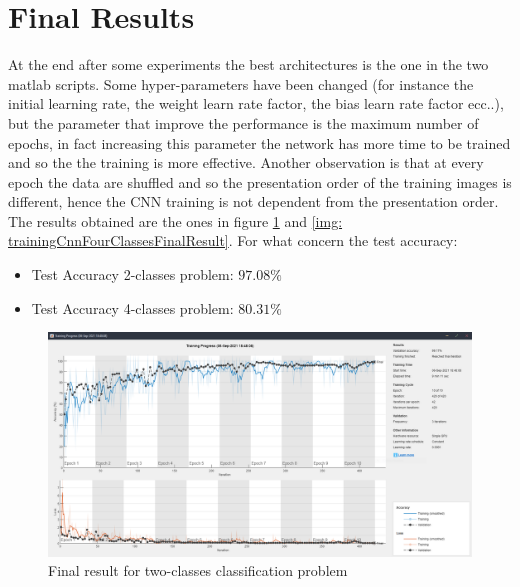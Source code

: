 \documentclass[a4paper]{report}
\begin{document}
	\section{Final Results}
	\label{sec: final}
	\noindent At the end after some experiments the best architectures is the one in the two matlab scripts. Some hyper-parameters have been changed (for instance the initial learning rate, the weight learn rate factor, the bias learn rate factor ecc..), but the parameter that improve the performance is the maximum number of epochs, in fact increasing this parameter the network has more time to be trained and so the the training is more effective. Another observation is that at every epoch the data are shuffled and so the presentation order of the training images is different, hence the CNN training is not dependent from the presentation order. The results obtained are the ones in figure \ref{img: trainingCnnTwoClassesFinalResult} and \ref{img: trainingCnnFourClassesFinalResult}. For what concern the test accuracy:
	\begin{itemize}
	\item Test Accuracy 2-classes problem: $97.08\%$
	\item Test Accuracy 4-classes problem: $80.31\%$
	\end{itemize}
	
	\begin{figure}[htbp]
		\centering
		\includegraphics[scale=0.31]{img/trainingCnnTwoClassesFinalResult.png}
		\caption{Final result for two-classes classification problem}
		\label{img: trainingCnnTwoClassesFinalResult}
	\end{figure}
\end{document}
